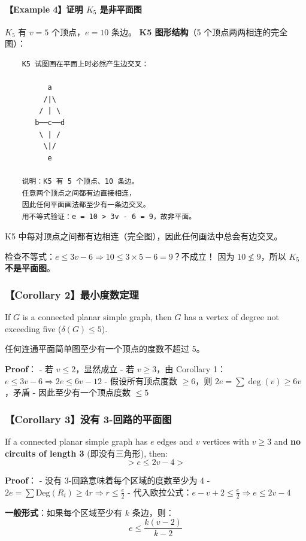 \documentclass[10pt,a4paper,openany]{ctexbook}
\theoremstyle{definition}
\theoremstyle{remark}
\renewenvironment{quote}
  {\list{}{\leftmargin=1em\rightmargin=0pt\topsep=0.5pt\partopsep=0pt}\item[]}
  {\endlist}
\begin{document}
\paragraph{【Example 4】证明 $K_5$ 是非平面图}

$K_5$ 有 $v = 5$ 个顶点，$e = 10$ 条边。
\textbf{K5 图形结构}（5 个顶点两两相连的完全图）：
{\footnotesize\begin{verbatim}
    K5 试图画在平面上时必然产生边交叉：

          a
         /|\
        / | \
       b──c──d
        \ | /
         \|/
          e

    说明：K5 有 5 个顶点、10 条边。
    任意两个顶点之间都有边直接相连，
    因此任何平面画法都至少有一条边交叉。
    用不等式验证：e = 10 > 3v - 6 = 9，故非平面。
\end{verbatim}}

\begin{quote}
K5 中每对顶点之间都有边相连（完全图），因此任何画法中总会有边交叉。

检查不等式：$e \le 3v - 6 \Rightarrow 10 \le 3 \times 5 - 6 = 9$？不成立！
因为 $10 \nleq 9$，所以 $K_5$ \textbf{不是平面图}。

\end{quote}
\vspace{-2pt}

\subsubsection{【Corollary 2】最小度数定理}

\begin{quote}
If $G$ is a connected planar simple graph, then $G$ has a vertex of degree not exceeding five ($\delta(G) \le 5$).

任何连通平面简单图至少有一个顶点的度数不超过 5。

\textbf{Proof}：
- 若 $v \le 2$，显然成立
- 若 $v \ge 3$，由 Corollary 1：$e \le 3v - 6 \Rightarrow 2e \le 6v - 12$
- 假设所有顶点度数 $\ge 6$，则 $2e = \sum \deg(v) \ge 6v$，矛盾
- 因此至少有一个顶点度数 $\le 5$

\end{quote}
\vspace{-2pt}

\subsubsection{【Corollary 3】没有 3-回路的平面图}

\begin{quote}
If a connected planar simple graph has $e$ edges and $v$ vertices with $v \ge 3$ and \textbf{no circuits of length 3} (即没有三角形), then:
\[
> e \le 2v - 4
> 
\]


\textbf{Proof}：
- 没有 3-回路意味着每个区域的度数至少为 4
- $2e = \sum \text{Deg}(R_i) \ge 4r \Rightarrow r \le \frac{e}{2}$
- 代入欧拉公式：$e - v + 2 \le \frac{e}{2} \Rightarrow e \le 2v - 4$

\textbf{一般形式}：如果每个区域至少有 $k$ 条边，则：
\[
e \le \frac{k(v - 2)}{k - 2}
\]


\end{quote}
\end{document}
